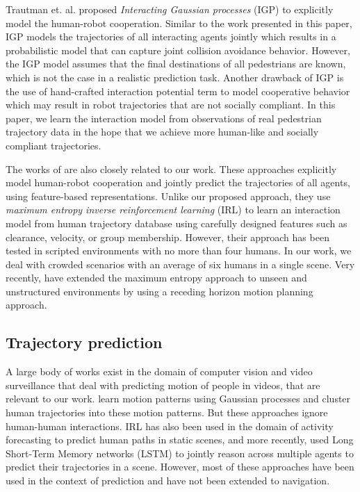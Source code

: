 Trautman et. al. \cite{trautman10} proposed \textit{Interacting Gaussian processes} (IGP) to explicitly model the human-robot cooperation. Similar to the work presented in this paper, IGP models the trajectories of all interacting agents jointly which results in a probabilistic model that can capture joint collision avoidance behavior. However, the IGP model assumes that the final destinations of all pedestrians are known, which is not the case in a realistic prediction task. 
%
Another drawback of IGP is the use of hand-crafted interaction potential term to model cooperative behavior which may result in robot trajectories that are not socially compliant. In this paper, we learn the interaction model from observations of real pedestrian trajectory data in the hope that we achieve more human-like and socially compliant trajectories. 

%

The works of \cite{kuderer12, Kretzschmar16} are also closely related to our work. These approaches explicitly model human-robot cooperation and jointly predict the trajectories of all agents, using feature-based representations. 
Unlike our proposed approach, they use \textit{maximum entropy inverse reinforcement learning} (IRL) to learn an interaction model from human trajectory database using carefully designed features 
%
such as clearance, velocity, or group membership.
However, their approach has been tested in scripted environments with no more than four humans. In our work, we deal with crowded scenarios with an average of six humans in a single scene. Very recently, \cite{pfeiffer16} have extended the maximum entropy approach to unseen and unstructured environments by using a receding horizon motion planning approach.
%

\subsection{Trajectory prediction}
\label{sec:oigp-traj-pred}

A large body of works exist in the domain of computer vision and video surveillance that deal with predicting motion of people in videos, that are relevant to our work. \cite{kim11, joseph2011bayesian} learn motion patterns using Gaussian processes and cluster human trajectories into these motion patterns. But these approaches ignore human-human interactions. IRL has also been used in the domain of activity forecasting to predict human paths in static scenes, \cite{kitani2012activity} and more recently, \cite{alahi16} used Long Short-Term Memory networks (LSTM) to jointly reason across multiple agents to predict their trajectories in a scene. However, most of these approaches have been used in the context of prediction and have not been extended to navigation.

